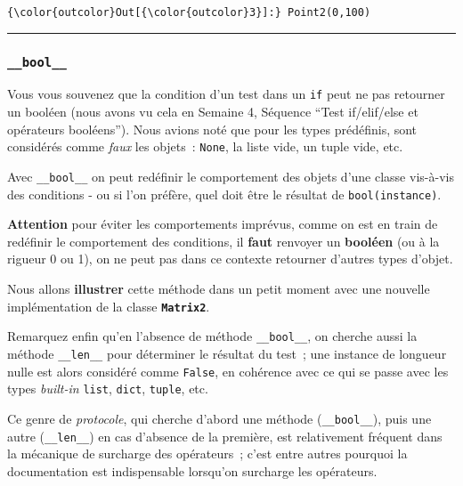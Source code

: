 \begin{Verbatim}[commandchars=\\\{\},frame=single,framerule=0.3mm,rulecolor=\color{cellframecolor}]
{\color{outcolor}Out[{\color{outcolor}3}]:} Point2(0,100)
\end{Verbatim}
            
    \begin{center}\rule{0.5\linewidth}{\linethickness}\end{center}

    \hypertarget{bool__}{%
\subsubsection{\texorpdfstring{\texttt{\_\_bool\_\_}}{\_\_bool\_\_}}\label{bool__}}

    Vous vous souvenez que la condition d'un test dans un \texttt{if} peut
ne pas retourner un booléen (nous avons vu cela en Semaine 4, Séquence
``Test if/elif/else et opérateurs booléens''). Nous avions noté que pour
les types prédéfinis, sont considérés comme \emph{faux} les objets~:
\texttt{None}, la liste vide, un tuple vide, etc.

Avec \texttt{\_\_bool\_\_} on peut redéfinir le comportement des objets
d'une classe vis-à-vis des conditions - ou si l'on préfère, quel doit
être le résultat de \texttt{bool(instance)}.

\textbf{Attention} pour éviter les comportements imprévus, comme on est
en train de redéfinir le comportement des conditions, il \textbf{faut}
renvoyer un \textbf{booléen} (ou à la rigueur 0 ou 1), on ne peut pas
dans ce contexte retourner d'autres types d'objet.

Nous allons \textbf{illustrer} cette méthode dans un petit moment avec
une nouvelle implémentation de la classe \textbf{\texttt{Matrix2}}.

Remarquez enfin qu'en l'absence de méthode \texttt{\_\_bool\_\_}, on
cherche aussi la méthode \texttt{\_\_len\_\_} pour déterminer le
résultat du test~; une instance de longueur nulle est alors considéré
comme \texttt{False}, en cohérence avec ce qui se passe avec les types
\emph{built-in} \texttt{list}, \texttt{dict}, \texttt{tuple}, etc.

Ce genre de \emph{protocole}, qui cherche d'abord une méthode
(\texttt{\_\_bool\_\_}), puis une autre (\texttt{\_\_len\_\_}) en cas
d'absence de la première, est relativement fréquent dans la mécanique de
surcharge des opérateurs~; c'est entre autres pourquoi la documentation
est indispensable lorsqu'on surcharge les opérateurs.

